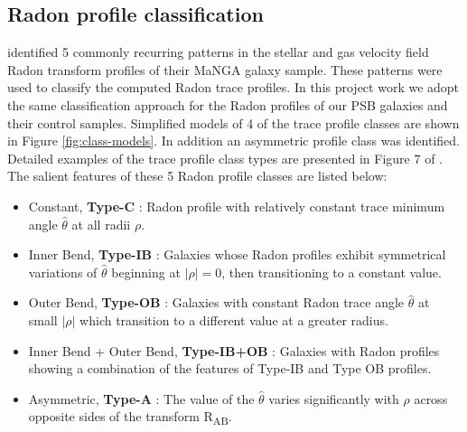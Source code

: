 \subsection{Radon profile classification}
\label{sec:Radon-classification}

\cite{2018MNRAS.480.2217S} identified 5 commonly recurring patterns in the stellar and gas velocity field Radon transform profiles of their MaNGA galaxy sample. These patterns were used to classify the computed Radon trace profiles. In this project work we adopt the same classification approach for the Radon profiles of our PSB galaxies and their control samples. Simplified models of 4 of the trace profile classes are shown in Figure \ref{fig:class-models}. In addition an asymmetric profile class was identified. Detailed examples of the trace profile class types are presented in Figure 7 of \cite{2018MNRAS.480.2217S}. The salient features of these 5 Radon profile classes are listed below:

\begin{itemize}
    \item Constant, \textbf{Type-C} : Radon profile with relatively constant trace minimum angle $\hat{\theta}$ at all radii $\rho$.
    \item Inner Bend, \textbf{Type-IB} : Galaxies whose Radon profiles exhibit symmetrical variations of $\hat{\theta}$ beginning at $|\rho|=0$, then transitioning to a constant value. 
    \item Outer Bend, \textbf{Type-OB} : Galaxies with constant Radon trace angle $\hat{\theta}$  at small $|\rho|$ which transition to a different value at a greater radius. 
    \item Inner Bend + Outer Bend, \textbf{Type-IB+OB} : Galaxies with Radon profiles showing a combination of the features of Type-IB and Type OB profiles.
    \item Asymmetric, \textbf{Type-A} : The value of the $\hat{\theta}$ varies significantly with $\rho$ across opposite sides of the transform R\textsubscript{AB}. 
 \end{itemize}

